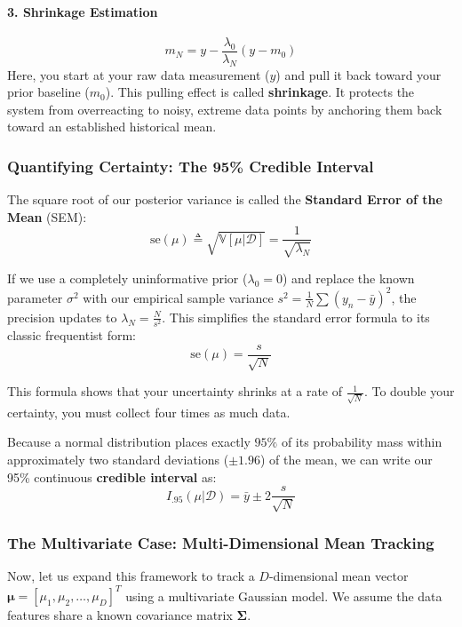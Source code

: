 \documentclass{article}
\begin{document}
\paragraph{3. Shrinkage Estimation}
\begin{equation}
m_N = y - \frac{\lambda_0}{\lambda_N}(y - m_0)
\end{equation}
Here, you start at your raw data measurement ($y$) and pull it back toward your prior baseline ($m_0$). This pulling effect is called \textbf{shrinkage}. It protects the system from overreacting to noisy, extreme data points by anchoring them back toward an established historical mean.

\subsubsection{Quantifying Certainty: The 95\% Credible Interval}
The square root of our posterior variance is called the \textbf{Standard Error of the Mean} (SEM):
\begin{equation}
\text{se}(\mu) \triangleq \sqrt{\mathbb{V}[\mu|\mathcal{D}]} = \frac{1}{\sqrt{\lambda_N}}
\end{equation}

If we use a completely uninformative prior ($\lambda_0 = 0$) and replace the known parameter $\sigma^2$ with our empirical sample variance $s^2 = \frac{1}{N}\sum (y_n - \bar{y})^2$, the precision updates to $\lambda_N = \frac{N}{s^2}$. This simplifies the standard error formula to its classic frequentist form:
\begin{equation}
\text{se}(\mu) = \frac{s}{\sqrt{N}}
\end{equation}

This formula shows that your uncertainty shrinks at a rate of $\frac{1}{\sqrt{N}}$. To double your certainty, you must collect four times as much data.

Because a normal distribution places exactly $95\%$ of its probability mass within approximately two standard deviations ($\pm 1.96$) of the mean, we can write our 95\% continuous \textbf{credible interval} as:
\begin{equation}
I_{.95}(\mu|\mathcal{D}) = \bar{y} \pm 2\frac{s}{\sqrt{N}}
\end{equation}

\subsubsection{The Multivariate Case: Multi-Dimensional Mean Tracking}
Now, let us expand this framework to track a $D$-dimensional mean vector $\boldsymbol{\mu} = [\mu_1, \mu_2, \dots, \mu_D]^T$ using a multivariate Gaussian model. We assume the data features share a known covariance matrix $\boldsymbol{\Sigma}$.
\end{document}
